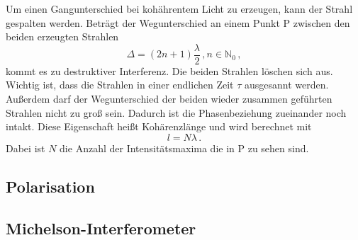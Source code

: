 Um einen Gangunterschied bei kohährentem Licht zu erzeugen, kann der Strahl gespalten werden.
Beträgt der Wegunterschied an einem Punkt P zwischen den beiden erzeugten Strahlen
\begin{equation*}
    Δ = \left(2n + 1\right)\frac{λ}{2}\, , n \in \mathbb{N}_0\, ,
\end{equation*}
kommt es zu destruktiver Interferenz. Die beiden Strahlen löschen sich aus.
Wichtig ist, dass die Strahlen in einer endlichen Zeit $τ$ ausgesannt werden.
Außerdem darf der Wegunterschied der beiden wieder zusammen geführten Strahlen nicht zu groß sein.
Dadurch ist die Phasenbeziehung zueinander noch intakt.
Diese Eigenschaft heißt Kohärenzlänge und wird berechnet mit
\begin{equation*}
    l = N λ\, .
\end{equation*}
Dabei ist $N$ die Anzahl der Intensitätsmaxima die in P zu sehen sind.

\subsection{Polarisation}
\label{sec:Polarisation}


\subsection{Michelson-Interferometer}
\label{sec:Michelson-Interferometer}

